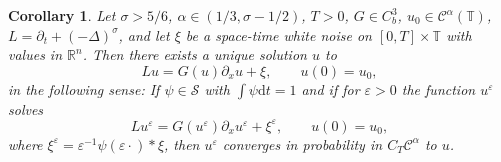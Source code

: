 \documentclass[a4paper,11pt]{article}
\newcommand{\mathd}{\mathrm{d}}
\newtheorem{corollary}[theorem]{Corollary}
\theoremstyle{remark}
\newcommand{\R}{\mathbb{R}}
\newcommand{\Lcal}{\mathcal{L}}
\newcommand{\CC}{\ensuremath{\mathscr{C}}}
\newcommand{\CS}{\ensuremath{\mathscr{S}}}
\newcommand{\reso}{\,\mathord{\circ}\,}
\begin{document}
\begin{corollary}
  Let $\sigma > 5/6$, $\alpha \in ( 1/3, \sigma -1/2 )$, $T>0$, $G \in C^3_b$, $u_0 \in \CC^\alpha(\mathbb{T})$, $L = \partial_t + (-\Delta)^\sigma$, and let $\xi$ be a space-time white noise on $[0,T] \times \mathbb{T}$ with values in $\R^n$. Then there exists a unique solution $u$ to
  \[
     L u = G(u) \partial_x u + \xi, \qquad u(0) = u_0,
  \]
  in the following sense: If $\psi \in \CS$ with $\int \psi \mathd t=1$ and if for $\varepsilon > 0$ the function $u^\varepsilon$ solves
  \[
     L u^\varepsilon = G(u^\varepsilon) \partial_x u^\varepsilon + \xi^\varepsilon, \qquad u(0) = u_0,
  \]
  where $\xi^\varepsilon = \varepsilon^{-1} \psi(\varepsilon \cdot) \ast \xi$, then $u^\varepsilon$ converges in probability in $C_T \CC^\alpha$ to $u$.
%  
%  
\end{corollary}
\end{document}
